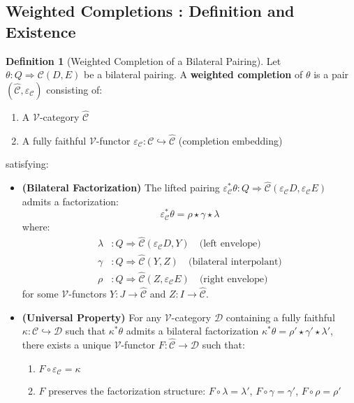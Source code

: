 \documentclass[11pt]{article}
\theoremstyle{plain}
\theoremstyle{definition}
\newtheorem{definition}[theorem]{Definition}
\theoremstyle{remark}
\newcommand{\V}{\mathcal{V}}
\begin{document}
\subsection{Weighted Completions : Definition and Existence}

\begin{definition}[Weighted Completion of a Bilateral Pairing]\label{def:weighted-completion}
Let $\theta : Q \Rightarrow \mathcal{C}(D,E)$ be a bilateral pairing. A \textbf{weighted completion} of $\theta$ is a pair $(\widehat{\mathcal{C}}, \varepsilon_{\mathcal{C}})$ consisting of:
\begin{enumerate}
\item A $\V$-category $\widehat{\mathcal{C}}$
\item A fully faithful $\V$-functor $\varepsilon_{\mathcal{C}} : \mathcal{C} \hookrightarrow \widehat{\mathcal{C}}$ (completion embedding)
\end{enumerate}
satisfying:

\begin{itemize}
\item \textbf{(Bilateral Factorization)} The lifted pairing $\varepsilon_{\mathcal{C}}^* \theta : Q \Rightarrow \widehat{\mathcal{C}}(\varepsilon_{\mathcal{C}} D, \varepsilon_{\mathcal{C}} E)$ admits a factorization:
$$\varepsilon_{\mathcal{C}}^* \theta = \rho \star \gamma \star \lambda$$
where:
\begin{align}
\lambda &: Q \Rightarrow \widehat{\mathcal{C}}(\varepsilon_{\mathcal{C}} D, Y) \quad \text{(left envelope)} \\
\gamma &: Q \Rightarrow \widehat{\mathcal{C}}(Y, Z) \quad \text{(bilateral interpolant)} \\
\rho &: Q \Rightarrow \widehat{\mathcal{C}}(Z, \varepsilon_{\mathcal{C}} E) \quad \text{(right envelope)}
\end{align}
for some $\V$-functors $Y : J \to \widehat{\mathcal{C}}$ and $Z : I \to \widehat{\mathcal{C}}$.

\item \textbf{(Universal Property)} For any $\V$-category $\mathcal{D}$ containing a fully faithful $\kappa : \mathcal{C} \hookrightarrow \mathcal{D}$ such that $\kappa^* \theta$ admits a bilateral factorization $\kappa^* \theta = \rho' \star \gamma' \star \lambda'$, there exists a unique $\V$-functor $F : \widehat{\mathcal{C}} \to \mathcal{D}$ such that:
\begin{enumerate}
\item $F \circ \varepsilon_{\mathcal{C}} = \kappa$
\item $F$ preserves the factorization structure: $F \circ \lambda = \lambda'$, $F \circ \gamma = \gamma'$, $F \circ \rho = \rho'$
\end{enumerate}
\end{itemize}
\end{definition}
\end{document}
